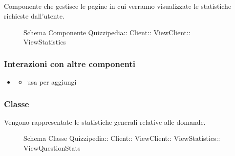 \subsection{}
Componente che gestisce le pagine in cui verranno visualizzate le statistiche richieste dall'utente.
\begin{figure}[H]
\centering
\noindent{}
\caption[Schema Componente ViewStatistics]{Schema Componente Quizzipedia:: Client:: ViewClient:: ViewStatistics}
\end{figure}
\subsubsection{Interazioni con altre componenti}
\begin{itemize}
\item {}
\begin{itemize}
\item usa  per aggiungi
\end{itemize}
\end{itemize}
\subsubsection{Classe }
Vengono rappresentate le statistiche generali relative alle domande.
\begin{figure}[H]
\centering
\noindent{}
\caption[Schema Classe ViewQuestionStats]{Schema Classe Quizzipedia:: Client:: ViewClient:: ViewStatistics:: ViewQuestionStats}
\end{figure}
